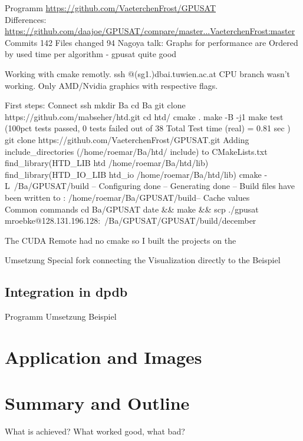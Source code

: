 \documentclass[a4paper, 12pt]{scrartcl}
\begin{document}
Programm \url{https://github.com/VaeterchenFrost/GPUSAT} \\
Differences: \url{https://github.com/daajoe/GPUSAT/compare/master...VaeterchenFrost:master}  Commits 142 Files changed 94 
Nagoya talk:
Graphs for performance are Ordered by used time per algorithm - gpusat quite good

Working with cmake remotly. ssh @(sg1.)dbai.tuwien.ac.at
CPU branch wasn't working.
Only AMD/Nvidia graphics  with respective flags.

First steps:
Connect ssh
mkdir Ba
cd Ba
git clone https://github.com/mabseher/htd.git
 cd htd/
 cmake .
 make -B -j1 
 make test
 (100pct tests passed, 0 tests failed out of 38                                                                                                                                                                                                                                                                                                             Total Test time (real) =   0.81 sec )\\

git clone https://github.com/VaeterchenFrost/GPUSAT.git
Adding include_directories (/home/roemar/Ba/htd/
include) to CMakeLists.txt \\
find_library(HTD_LIB htd /home/roemar/Ba/htd/lib)
find_library(HTD_IO_LIB htd_io /home/roemar/Ba/htd/lib) 
cmake - L~/Ba/GPUSAT/build
-- Configuring done
-- Generating done
-- Build files have been written to : /home/roemar/Ba/GPUSAT/build-- Cache values 
\\
Common commands
cd Ba/GPUSAT      
date \&\& make \&\& scp ./gpusat mroebke@128.131.196.128:~/Ba/GPUSAT/GPUSAT/build/december

The CUDA Remote had no cmake so I built the projects on the 

Umsetzung Special fork connecting the Visualization directly to the 
Beispiel
\newpage
\subsection{Integration in dpdb}
Programm
Umsetzung
Beispiel
\newpage
\section{Application and Images }
\newpage
\section{Summary and Outline}
What is achieved?
What worked good, what bad?
{}

\end{document}

